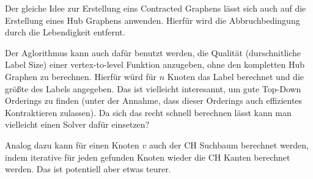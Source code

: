 Der gleiche Idee zur Erstellung eins Contracted Graphens lässt sich auch auf die Erstellung eines Hub Graphens anwenden.
Hierfür wird die Abbruchbedingung durch die Lebendigkeit entfernt.

Der Aglorithmus kann auch dafür benutzt werden, die Qualität (durschnitliche Label Size) einer vertex-to-level Funktion anzugeben, ohne den kompletten Hub Graphen zu berechnen.
Hierfür würd für $n$ Knoten das Label berechnet und die größte des Labels angegeben.
Das ist vielleicht interesannt, um gute Top-Down Orderings zu finden (unter der Annahme, dass dieser Orderings auch effizientes Kontraktieren zulassen).
Da sich das recht schnell berechnen lässt kann man vielleicht einen Solver dafür einsetzen?

Analog dazu kann für einen Knoten $v$ auch der CH Suchbaum berechnet werden, indem iterative für jeden gefunden Knoten wieder die CH Kanten berechnet werden. Das ist potentiell aber etwas teurer.
